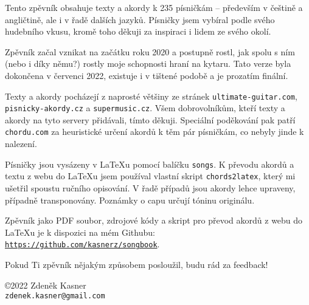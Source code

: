 \documentclass{article}
\begin{document}
\begin{center}
  \vfill

  Tento zpěvník obsahuje texty a akordy k 235 písničkám -- především v češtině a angličtině, ale i v řadě dalších jazyků. Písničky jsem vybíral podle svého hudebního vkusu, kromě toho děkuji za inspiraci i lidem ze svého okolí.  \\ \vspace*{0.5cm}

Zpěvník začal vznikat na začátku roku 2020 a postupně rostl, jak spolu s ním (nebo i díky němu?) rostly moje schopnosti hraní na kytaru. Tato verze byla dokončena v červenci 2022, existuje i v tištené podobě a je prozatím finální. \\ \vspace*{0.5cm}

  Texty a akordy pocházejí z naprosté většiny ze stránek \texttt{ultimate-guitar.com}, \texttt{pisnicky-akordy.cz} a \texttt{supermusic.cz}. Všem dobrovolníkům, kteří texty a akordy na tyto servery přidávali, tímto děkuji. Speciální poděkování pak patří \texttt{chordu.com} za heuristické určení akordů k těm pár písničkám, co nebyly jinde k nalezení.  \\ \vspace*{0.5cm}

  Písničky jsou vysázeny v \LaTeX u pomocí balíčku \texttt{songs}. K převodu akordů a textu z webu do \LaTeX u jsem používal vlastní skript \texttt{chords2latex}, který mi ušetřil spoustu ručního opisování. V řadě případů jsou akordy lehce upraveny, případně transponovány. Poznámky o capu určují tóninu originálu. \\ \vspace*{0.5cm}

  Zpěvník jako PDF soubor, zdrojové kódy a skript pro převod akordů z webu do \LaTeX u je k dispozici na mém Githubu: \texttt{\url{https://github.com/kasnerz/songbook}}.  \\ \vspace*{0.5cm}

  Pokud Ti zpěvník nějakým způsobem posloužil, budu rád za feedback! \\ \vspace*{0.5cm}

 
\copyright 2022 Zdeněk Kasner \\ \vspace*{0.1cm}
\texttt{zdenek.kasner@gmail.com} \\ \vspace*{0.5cm}
\byncsa
\end{center}

\end{document}
